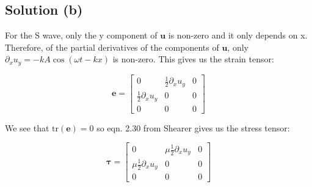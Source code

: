\subsection*{Solution (b)}

For the S wave, only the y component of $\mathbf{u}$ is non-zero and it only depends on x. Therefore, of the partial derivatives of the components of $\mathbf{u}$, only $\partial_xu_y = -kA\cos(\omega t-kx)$ is non-zero. This gives us the strain tensor:

\begin{equation*}
    \mathbf{e} = 
    \begin{bmatrix}
        0 & \frac{1}{2}\partial_x u_y & 0 \\
        \frac{1}{2}\partial_x u_y & 0 & 0\\
        0 & 0 & 0
    \end{bmatrix}
\end{equation*}

We see that $\text{tr}(\mathbf{e}) = 0$ so eqn. 2.30 from Shearer gives us the stress tensor:

\begin{equation*}
    \boldsymbol{\tau} = 
    \begin{bmatrix}
        0 & \mu\frac{1}{2}\partial_x u_y & 0 \\
        \mu\frac{1}{2}\partial_x u_y & 0 & 0\\
        0 & 0 & 0
    \end{bmatrix}
\end{equation*}